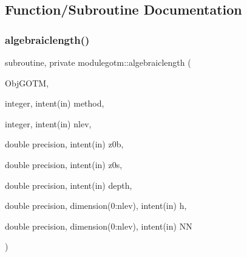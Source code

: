 \subsection{Function/\+Subroutine Documentation}
\mbox{\label{namespacemodulegotm_a91db88191066626042c7b8aba8a116ab}} 
\subsubsection{\texorpdfstring{algebraiclength()}{algebraiclength()}}
{\footnotesize\ttfamily subroutine, private modulegotm\+::algebraiclength (\begin{DoxyParamCaption}\item[{}]{Obj\+G\+O\+TM,  }\item[{integer, intent(in)}]{method,  }\item[{integer, intent(in)}]{nlev,  }\item[{double precision, intent(in)}]{z0b,  }\item[{double precision, intent(in)}]{z0s,  }\item[{double precision, intent(in)}]{depth,  }\item[{double precision, dimension(0\+:nlev), intent(in)}]{h,  }\item[{double precision, dimension(0\+:nlev), intent(in)}]{NN }\end{DoxyParamCaption})\hspace{0.3cm}{\ttfamily [private]}}

